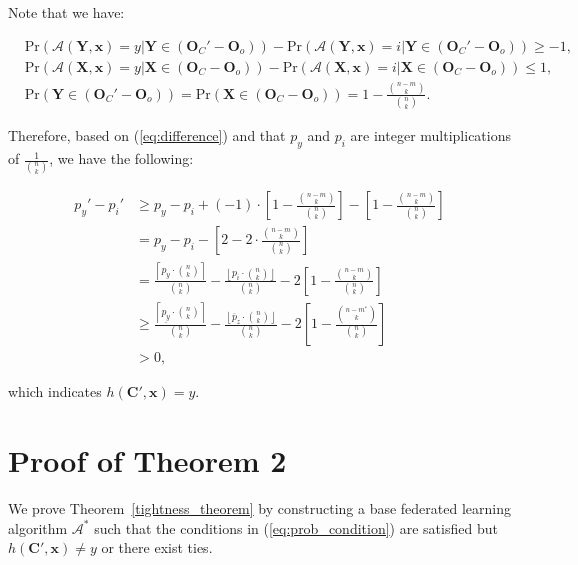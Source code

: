 \documentclass[letterpaper]{article} %
\begin{document}
Note that we have:

\begin{align}
	&\text{Pr}(\mathcal{A}(\mathbf{Y},\mathbf{x})=y|\mathbf{Y}\in(\mathbf{O}_C'-\mathbf{O}_o)) - \text{Pr}(\mathcal{A}(\mathbf{Y},\mathbf{x})=i|\mathbf{Y}\in(\mathbf{O}_C'-\mathbf{O}_o)) \ge -1, \\
	&\text{Pr}(\mathcal{A}(\mathbf{X},\mathbf{x})=y|\mathbf{X}\in(\mathbf{O}_C-\mathbf{O}_o)) - \text{Pr}(\mathcal{A}(\mathbf{X},\mathbf{x})=i|\mathbf{X}\in(\mathbf{O}_C-\mathbf{O}_o)) \le 1,\\
	&\text{Pr}(\mathbf{Y}\in(\mathbf{O}_C'-\mathbf{O}_o)) = \text{Pr}(\mathbf{X}\in(\mathbf{O}_C-\mathbf{O}_o)) = 1 - \frac{{n-m \choose k}}{{n \choose k}}. 
\end{align}

 Therefore, based on (\ref{eq:difference}) and that $p_y$ and $p_i$ are integer multiplications of $\frac{1}{{n \choose k}}$, we have the following: 

\begin{align}
	p_y'- p_i' &\ge p_y - p_i + (-1)\cdot \left[1 - \frac{{n-m \choose k}}{{n \choose k}}\right] - \left[1 - \frac{{n-m \choose k}}{{n \choose k}}\right]\\
			&= p_y - p_i - \left[2 - 2\cdot\frac{{n-m \choose k}}{{n \choose k}}\right]\\
			&= \frac{\left\lceil p_y \cdot {n \choose k}\right\rceil}{{n \choose k}} - \frac{\left\lfloor p_i \cdot {n \choose k}\right\rfloor}{{n\choose k}} - 2\left[1 - \frac{{n-m \choose k}}{{n \choose k}}\right] \\
			&\ge \frac{\left\lceil\underline{p_y} \cdot {n \choose k}\right\rceil}{{n \choose k}} - \frac{\left\lfloor\overline{p}_z \cdot {n \choose k}\right\rfloor}{{n\choose k}} - 2\left[1 - \frac{{n-m^* \choose k}}{{n \choose k}}\right]\\
			&> 0,
\end{align}

which indicates $h(\mathbf{C'}, \mathbf{x}) = y$. 

\section{Proof of Theorem 2}
\label{proof_of_tightness}

We prove Theorem~\ref{tightness_theorem} by constructing a base federated learning algorithm $\mathcal{A}^*$ 
such that the conditions in (\ref{eq:prob_condition}) are satisfied but $h(\mathbf{C'}, \mathbf{x}) \neq y$ or there exist ties. 
\end{document}
